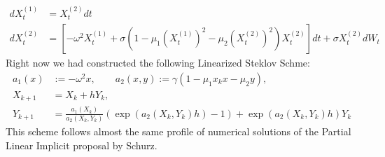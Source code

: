 \documentclass[review]{elsarticle}
\begin{document}
			\begin{align*}
				dX_t^{(1)}	&= X_t^{(2)} dt \\
				dX_t^{(2)}	&=
					\left[
						-\omega^2 X_t^{(1)} 
						+\sigma 
						\left(
							1 - \mu_1 \left( X_t^{(1)} \right)^2
							- \mu_2 \left( X_t^{(2)} \right)^2
						\right)
						X_t^{(2)}
					\right]dt
				+\sigma X_t^{(2)} dW_t
			\end{align*}
			Right now we had constructed the following Linearized Steklov Schme:
			\begin{align*}
				a_1(x)&		:= -\omega^2 x, \qquad
				a_2(x,y)	:= \gamma (1-\mu_1 x_k x - \mu_2 y ),	\\
				X_{k+1} &= X_k + h Y_k,								\\
				Y_{k+1} &= \frac{a_1(X_k)}{a_2(X_k, Y_k)}
						\left(
							\exp(a_2(X_k, Y_k) h) - 1
						\right)
						+ \exp(a_2(X_k, Y_k) h) Y_k
			\end{align*}
			This scheme follows almost the same profile of numerical solutions of the Partial Linear
			Implicit proposal by Schurz.
\end{document}
